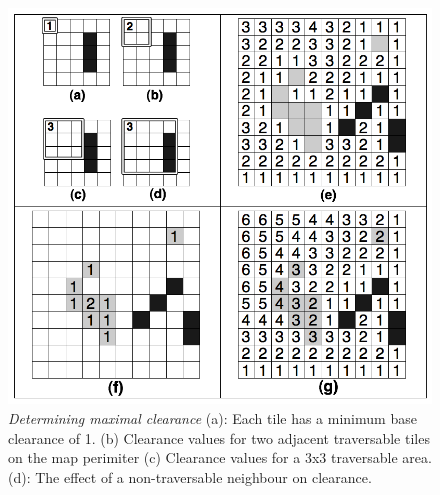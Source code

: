 \begin{figure}[htbp]
        \caption{\emph{Determining maximal clearance} (a): Each tile has a minimum base clearance of 1. (b) Clearance values for two adjacent traversable tiles on the map perimiter (c) Clearance values for a 3x3 traversable area. (d): The effect of a non-traversable neighbour on clearance. }
        \begin{center}
                        \includegraphics[scale=0.7]{diagrams/calculatingclearance.png}
        \end{center}
        \label{effp-fig:calculatingclearance}
\end{figure}


